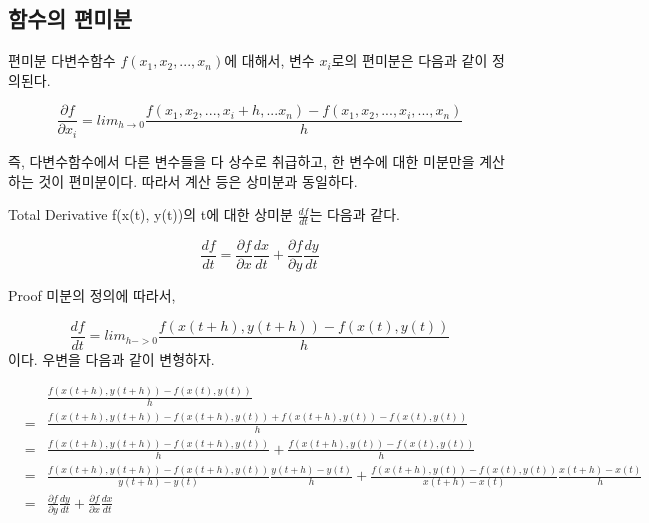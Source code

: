 \documentclass{beamer}
\begin{document}



\subsection{함수의 편미분} 

 

\begin{frame}{편미분}
다변수함수 $f(x_1, x_2, ..., x_n)$에 대해서, 변수 $x_i$로의 편미분은 다음과 같이 정의된다. 

\begin{equation} 
\frac{\partial f}{\partial x_i} = lim_{h \rightarrow 0} \frac{f(x_1, x_2, ..., x_i+h, ... x_n) - f(x_1, x_2, ..., x_i, ..., x_n)}{h}
\end{equation}

즉, 다변수함수에서 다른 변수들을 다 상수로 취급하고, 한 변수에 대한 미분만을 계산하는 것이 편미분이다. 따라서 계산 등은 상미분과 동일하다. 

\end{frame} 

\begin{frame}{Total Derivative} 
f(x(t), y(t))의 t에 대한 상미분 $\frac{df}{dt}$는 다음과 같다. 

\begin{equation}
\frac{df}{dt} = \frac{\partial f}{\partial x}\frac{dx}{dt} +  \frac{\partial f}{\partial y}\frac{dy}{dt}
\end{equation}
\end{frame}

\begin{frame}{Proof} 
미분의 정의에 따라서, 

\begin{equation} 
\frac{df}{dt} = lim_{h->0} \frac{f(x(t+h), y(t+h)) - f(x(t), y(t))}{h}
\end{equation}
이다. 우변을 다음과 같이 변형하자. 

\begin{eqnarray} 
&& \frac{f(x(t+h), y(t+h)) - f(x(t), y(t))}{h} \\
&=&  \frac{f(x(t+h), y(t+h)) - f(x(t+h), y(t)) + f(x(t+h), y(t)) - f(x(t), y(t))}{h} \\ 
&=& \frac{f(x(t+h), y(t+h)) - f(x(t+h), y(t))}{h} + \frac{f(x(t+h), y(t)) - f(x(t), y(t))}{h} \\
&=& \frac{f(x(t+h), y(t+h)) - f(x(t+h), y(t))}{y(t+h)-y(t)} \frac{y(t+h) - y(t)}{h} + \frac{f(x(t+h), y(t)) - f(x(t), y(t))}{x(t+h) - x(t)} \frac{x(t+h) - x(t)}{h}\\ 
&=& \frac{\partial f}{\partial y}\frac{dy}{dt} + \frac{\partial f}{\partial x}\frac{dx}{dt} 
\end{eqnarray}
\end{frame}
\end{document}
